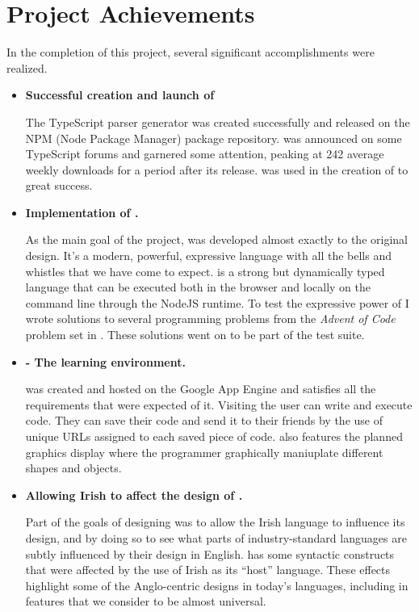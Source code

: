 \section{Project Achievements}
In the completion of this project, several significant accomplishments were realized.
\begin{itemize}
    \item \textbf{Successful creation and launch of \tsPEG{}}

        The TypeScript parser generator \tsPEG{} was created successfully and released on the NPM (Node Package Manager) package repository. \tsPEG{} was announced on some TypeScript forums and garnered some attention, peaking at 242 average weekly downloads for a period after its release. \tsPEG{} was used in the creation of \Setanta{} to great success.

    \item \textbf{Implementation of \Setanta{}.}

        As the main goal of the project, \Setanta{} was developed almost exactly to the original design. It's a modern, powerful, expressive language with all the bells and whistles that we have come to expect. \Setanta{} is a strong but dynamically typed language that can be executed both in the browser and locally on the command line through the NodeJS runtime. To test the expressive power of \Setanta{} I wrote solutions to several programming problems from the \emph{Advent of Code} problem set in \Setanta{}. These solutions went on to be part of the test suite.

    \item \textbf{\trys{} - The \Setanta{} learning environment.}

        \trys{} was created and hosted on the Google App Engine and satisfies all the requirements that were expected of it. Visiting \trys{} the user can write and execute \Setanta{} code. They can save their code and send it to their friends by the use of unique URLs assigned to each saved piece of code. \trys{} also features the planned graphics display where the programmer graphically maniuplate different shapes and objects.

    \item \textbf{Allowing Irish to affect the design of \Setanta{}.}

        Part of the goals of designing \Setanta{} was to allow the Irish language to influence its design, and by doing so to see what parts of industry-standard languages are subtly influenced by their design in English. \Setanta{} has some syntactic constructs that were affected by the use of Irish as its ``host'' language. These effects highlight some of the Anglo-centric designs in today's languages, including in features that we consider to be almost universal.


\end{itemize}
